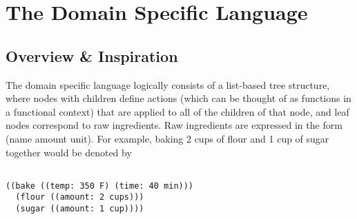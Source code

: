 























\newpage
\section{The Domain Specific Language}
\subsection{Overview \& Inspiration}
The domain specific language logically consists of a list-based tree structure, where nodes with children define actions (which can be thought of as functions in a functional context) that are applied to all of the children of that node, and leaf nodes correspond to raw ingredients. Raw ingredients are expressed in the form (name amount unit). For example, baking 2 cups of flour and 1 cup of sugar together would be denoted by

\begin{verbatim}

((bake ((temp: 350 F) (time: 40 min)))
  (flour ((amount: 2 cups)))
  (sugar ((amount: 1 cup))))
\end{verbatim}

